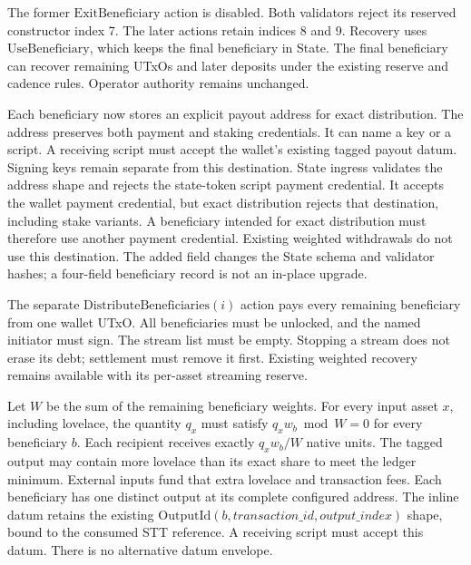 \documentclass[11pt,DIV=11,parskip=half-]{scrartcl}
\begin{document}
The former $\mathrm{ExitBeneficiary}$ action is disabled. Both validators reject its reserved constructor index 7. The later actions retain indices 8 and 9. Recovery uses $\mathrm{UseBeneficiary}$, which keeps the final beneficiary in State. The final beneficiary can recover remaining UTxOs and later deposits under the existing reserve and cadence rules. Operator authority remains unchanged.

Each beneficiary now stores an explicit payout address for exact distribution. The address preserves both payment and staking credentials. It can name a key or a script. A receiving script must accept the wallet's existing tagged payout datum. Signing keys remain separate from this destination. State ingress validates the address shape and rejects the state-token script payment credential. It accepts the wallet payment credential, but exact distribution rejects that destination, including stake variants. A beneficiary intended for exact distribution must therefore use another payment credential. Existing weighted withdrawals do not use this destination. The added field changes the State schema and validator hashes; a four-field beneficiary record is not an in-place upgrade.

The separate $\mathrm{DistributeBeneficiaries}(i)$ action pays every remaining beneficiary from one wallet UTxO. All beneficiaries must be unlocked, and the named initiator must sign. The stream list must be empty. Stopping a stream does not erase its debt; settlement must remove it first. Existing weighted recovery remains available with its per-asset streaming reserve.

Let $W$ be the sum of the remaining beneficiary weights. For every input asset $x$, including lovelace, the quantity $q_x$ must satisfy $q_x w_b \bmod W=0$ for every beneficiary $b$. Each recipient receives exactly $q_x w_b/W$ native units. The tagged output may contain more lovelace than its exact share to meet the ledger minimum. External inputs fund that extra lovelace and transaction fees. Each beneficiary has one distinct output at its complete configured address. The inline datum retains the existing $\mathrm{OutputId}(b,\mathit{transaction\_id},\mathit{output\_index})$ shape, bound to the consumed STT reference. A receiving script must accept this datum. There is no alternative datum envelope.
\end{document}
